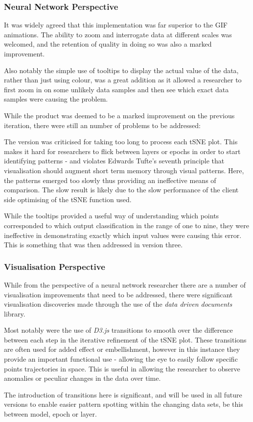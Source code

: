\documentclass[a4paper,11pt,titlepage]{article}
\begin{document}
	\subsubsection{Neural Network Perspective}
		It was widely agreed that this implementation was far superior to the GIF animations. The ability to zoom and interrogate data at different scales was welcomed, and the retention of quality in doing so was also a marked improvement.
		\par 
		Also notably the simple use of tooltips to display the actual value of the data, rather than just using colour, was a great addition as it allowed a researcher to first zoom in on some unlikely data samples and then see which exact data samples were causing the problem.
		\par 
		While the product was deemed to be a marked improvement on the previous iteration, there were still an number of problems to be addressed:
		\par 
		The version was criticised for taking too long to process each tSNE plot. This makes it hard for researchers to flick between layers or epochs in order to start identifying patterns - and violates Edwards Tufte's seventh principle that visualisation should augment short term memory through visual patterns. Here, the patterns emerged too slowly thus providing an ineffective means of comparison. The slow result is likely due to the slow performance of the client side optimising of the tSNE function used. 
		\par 
		While the tooltips provided a useful way of understanding which points corresponded to which output classification in the range of one to nine, they were ineffective in demonstrating exactly which input values were causing this error. This is something that was then addressed in version three.

		\subsubsection{Visualisation Perspective}
		While from the perspective of a neural network researcher there are a number of visualisation improvements that need to be addressed, there were significant visualisation discoveries made through the use of the \textit{data driven documents} library. 
		\par 
		Most notably were the use of \textit{D3.js} transitions to smooth over the difference between each step in the iterative refinement of the tSNE plot. These transitions are often used for added effect or embellishment, however in this instance they provide an important functional use - allowing the eye to easily follow specific points trajectories in space. This is useful in allowing the researcher to observe anomalies or peculiar changes in the data over time.	
		\par 
		The introduction of transitions here is significant, and will be used in all future versions to enable easier pattern spotting within the changing data sets, be this between model, epoch or layer.
	
\end{document}
